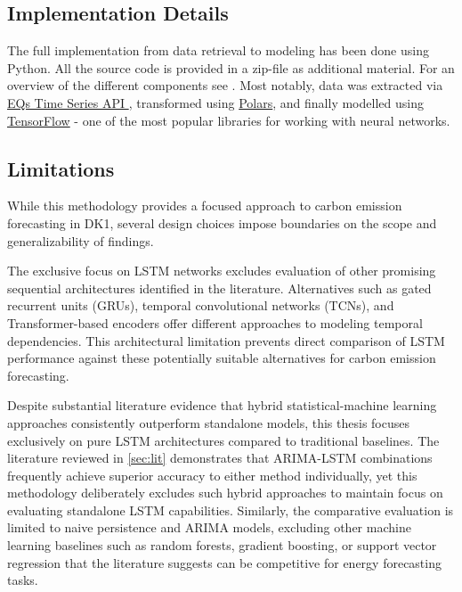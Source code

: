 \subsection{Implementation Details}

The full implementation from data retrieval to modeling has been done using Python. All the source code is provided in a zip-file as additional material. For an overview of the different components see . Most notably, data was extracted via \href{https://energyquantified-python.readthedocs.io/}{EQs Time Series API }, transformed using \href{https://pola.rs/}{Polars}, and finally modelled using \href{https://www.tensorflow.org/}{TensorFlow} - one of the most popular libraries for working with neural networks.

\subsection{Limitations}

While this methodology provides a focused approach to carbon emission forecasting in DK1, several design choices impose boundaries on the scope and generalizability of findings.

The exclusive focus on LSTM networks excludes evaluation of other promising sequential architectures identified in the literature. Alternatives such as gated recurrent units (GRUs), temporal convolutional networks (TCNs), and Transformer-based encoders offer different approaches to modeling temporal dependencies. This architectural limitation prevents direct comparison of LSTM performance against these potentially suitable alternatives for carbon emission forecasting.

Despite substantial literature evidence that hybrid statistical-machine learning approaches consistently outperform standalone models, this thesis focuses exclusively on pure LSTM architectures compared to traditional baselines. The literature reviewed in \autoref{sec:lit} demonstrates that ARIMA-LSTM combinations frequently achieve superior accuracy to either method individually, yet this methodology deliberately excludes such hybrid approaches to maintain focus on evaluating standalone LSTM capabilities. Similarly, the comparative evaluation is limited to naive persistence and ARIMA models, excluding other machine learning baselines such as random forests, gradient boosting, or support vector regression that the literature suggests can be competitive for energy forecasting tasks.

